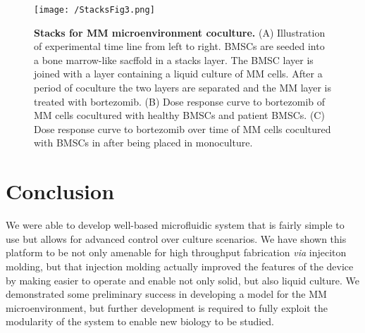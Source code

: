 \begin{figure}[h!] %
\centering
\texttt{[image: /StacksFig3.png]}
\caption[\textbf{Stacks for MM microenvironment coculture}]{\textbf{Stacks for MM microenvironment coculture.} (A) Illustration of experimental time line from left to right. BMSCs are seeded into a bone marrow-like sacffold in a stacks layer. The BMSC layer is joined with a layer containing a liquid culture of MM cells. After a period of coculture the two layers are separated and the MM layer is treated with bortezomib. (B) Dose response curve to bortezomib of MM cells cocultured with healthy BMSCs and patient BMSCs. (C) Dose response curve to bortezomib over time of MM cells cocultured with BMSCs in after being placed in monoculture.}
\label{figure:StacksFig3}
\end{figure}

\section{Conclusion}
We were able to develop well-based microfluidic system that is fairly simple to use but allows for advanced control over culture scenarios. We have shown this platform to be not only amenable for high throughput fabrication \textit{via} injeciton molding, but that injection molding actually improved the features of the device by making easier to operate and enable not only solid, but also liquid culture. We demonstrated some preliminary success in developing a model for the MM microenvironment, but further development is required to fully exploit the modularity of the system to enable new biology to be studied. 